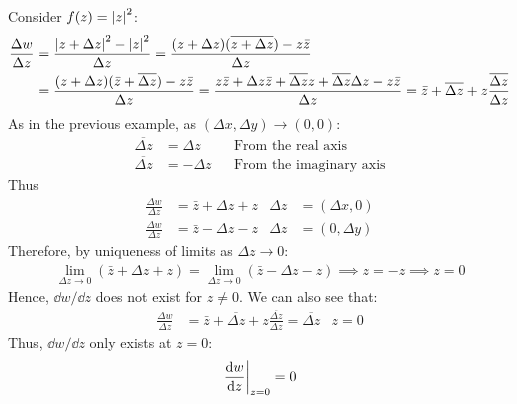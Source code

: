 \documentclass[12pt, english]{book}
\begin{document}
	\begin{example}
		Consider $f(z) = \abs{z}^2$:
		\begin{align*}
			\frac{\Delta w}{\Delta z} &= \frac{\abs{z + \Delta z}^2 - \abs{z}^2}{\Delta z}
				= \frac{(z + \Delta z)(\overline{z + \Delta z}) - z \bar{z}}{\Delta z} \\
				&= \frac{(z + \Delta z)(\bar{z} + \overline{\Delta z}) - z \bar{z}}{\Delta z} 
				= \frac{z\bar{z} + \Delta z \bar{z} + \overline{\Delta z} z + \overline{\Delta z} \Delta z - z \bar{z}}{\Delta z}
				= \bar{z} + \overline{\Delta z} + z\frac{\overline{\Delta z}}{\Delta z}
		\end{align*}
		As in the previous example, as $(\Delta x, \Delta y) \rightarrow (0,0)$:
		\begin{align*}
			\overline{\Delta z} &= \Delta z  & &\text{From the real axis} \\
			\overline{\Delta z} &= -\Delta z & &\text{From the imaginary axis}
		\end{align*}
		Thus
		\begin{align*}
			\frac{\Delta w}{\Delta z} &= \bar{z} + \Delta z + z & \Delta z &= (\Delta x, 0) \\
			\frac{\Delta w}{\Delta z} &= \bar{z} - \Delta z - z & \Delta z &= (0, \Delta y)
		\end{align*}
		Therefore, by uniqueness of limits as $\Delta z \rightarrow 0$:
		\begin{align*}
			\lim_{\Delta z \rightarrow 0} (\bar{z} + \Delta z + z) = \lim_{\Delta z \rightarrow 0} (\bar{z} - \Delta z - z )
			\implies  z = - z   \implies z = 0
		\end{align*}
		Hence, $\dd w /\dd z$ does not exist for $z \neq 0$.
		We can also see that:
		\begin{align*}
			\frac{\Delta w}{\Delta z}
			&= \bar{z} + \overline{\Delta z} + z\frac{\overline{\Delta z}}{\Delta z}
			= \overline{\Delta z}  & z = 0
		\end{align*}
		Thus, $\dd w /\dd z $ only exists at $z = 0$: 
		\[ \eval{\dv{w}{z}}_{z=0} = 0 \]
	\end{example}
	
\end{document}
